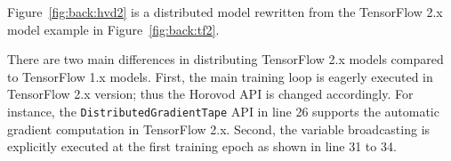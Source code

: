 Figure~\ref{fig:back:hvd2} is a distributed model rewritten from the
TensorFlow 2.x model example in Figure~\ref{fig:back:tf2}.
\begin{inred}
There are two main differences in distributing TensorFlow 2.x models compared to
TensorFlow 1.x models.
First, the main training loop is eagerly executed in TensorFlow 2.x version;
thus the Horovod API is changed accordingly.
For instance, the {\tt DistributedGradientTape} API in line 26
supports the automatic gradient computation in TensorFlow 2.x.
Second, the variable broadcasting is explicitly executed at the first training
epoch as shown in line 31 to 34.
\end{inred}

